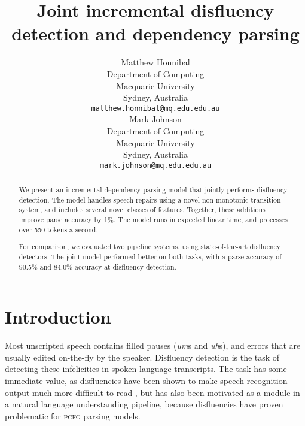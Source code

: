 \documentclass[11pt,letterpaper]{article}
\title{Joint incremental disfluency detection and dependency parsing}
\author{Matthew Honnibal\\
        Department of Computing\\
	    Macquarie University\\
        Sydney, Australia\\
	    {\tt \small matthew.honnibal@mq.edu.edu.au}\\
  \And
  Mark Johnson\\
  Department of Computing\\
  Macquarie University\\
  Sydney, Australia\\
  {\tt \small mark.johnson@mq.edu.edu.au}
}
\date{}
\newcommand{\pcfg}{\textsc{pcfg}\xspace}
\begin{document}
\maketitle
\begin{abstract}

We present an incremental dependency parsing model that jointly performs
disfluency detection.  The model handles speech repairs using a novel non-monotonic
transition system, and includes several novel classes of features.  Together, these
additions improve parse accuracy by 1\%.  The model runs in expected linear time,
and processes over 550 tokens a second.

For comparison, we evaluated two pipeline systems, using state-of-the-art disfluency
detectors.  The joint model performed better on both tasks,
with a parse accuracy of 90.5\% and 84.0\% accuracy at disfluency detection.

\end{abstract}

\section{Introduction}

Most unscripted speech contains filled pauses (\emph{um}s and \emph{uh}s), and
errors that are usually edited on-the-fly by the speaker. Disfluency detection
is the task of detecting these infelicities in spoken language transcripts. The
task has some immediate value, as disfluencies have been shown to make speech
recognition output much more difficult to read \citep{jones:03}, but has also
been motivated as a module in a natural language understanding pipeline, because
disfluencies have proven problematic for \pcfg parsing models.


\end{document}
